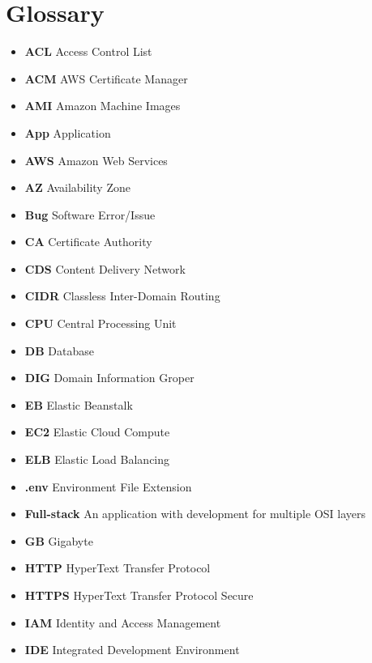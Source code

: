 \beforeabstract
\afterabstract
\chapter{Glossary}\label{ch:glossary}

\begin{itemize}
    \item  \textbf{ACL} \textemdash Access Control List
    \item  \textbf{ACM} \textemdash AWS Certificate Manager
    \item  \textbf{AMI} \textemdash Amazon Machine Images
    \item  \textbf{App} \textemdash Application
    \item  \textbf{AWS} \textemdash Amazon Web Services
    \item  \textbf{AZ} \textemdash Availability Zone
    \item  \textbf{Bug} \textemdash Software Error/Issue
    \item  \textbf{CA} \textemdash Certificate Authority
    \item  \textbf{CDS} \textemdash Content Delivery Network
    \item  \textbf{CIDR} \textemdash Classless Inter-Domain Routing
    \item  \textbf{CPU} \textemdash Central Processing Unit
    \item  \textbf{DB} \textemdash Database
    \item  \textbf{DIG} \textemdash Domain Information Groper
    \item  \textbf{EB} \textemdash Elastic Beanstalk
    \item  \textbf{EC2} \textemdash Elastic Cloud Compute
    \item  \textbf{ELB} \textemdash Elastic Load Balancing
    \item  \textbf{.env} \textemdash Environment File Extension
    \item  \textbf{Full-stack} \textemdash An application with development for multiple OSI layers
    \item  \textbf{GB} \textemdash Gigabyte
    \item  \textbf{HTTP} \textemdash HyperText Transfer Protocol
    \item  \textbf{HTTPS} \textemdash HyperText Transfer Protocol Secure
    \item  \textbf{IAM} \textemdash Identity and Access Management
    \item  \textbf{IDE} \textemdash Integrated Development Environment

\end{itemize}
